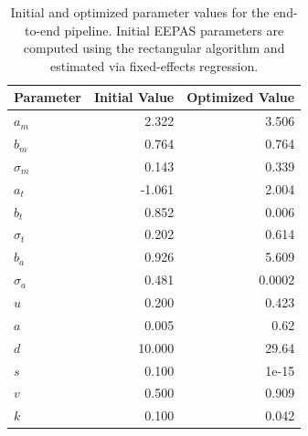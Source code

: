 \documentclass[extra,mreferee]{gji}
\theoremstyle{lemma}
\begin{document}
\begin{table}
\centering
 \caption{Initial and optimized parameter values for the end-to-end pipeline. Initial EEPAS parameters are computed using the rectangular algorithm and estimated via fixed-effects regression.}  \label{tbl:parameters_opt}
\begin{tabular}{lrr}
\toprule
\textbf{Parameter} & \textbf{Initial Value} & \textbf{Optimized Value} \\
\midrule
$a_m$         & 2.322                 & 3.506                    \\
$b_m$         & 0.764                  & 0.764                    \\
$\sigma_m$    & 0.143                  & 0.339                    \\
$a_t$         & -1.061                 & 2.004                    \\
$b_t$         & 0.852                  & 0.006                    \\
$\sigma_t$    & 0.202                  & 0.614                    \\
$b_a$         & 0.926                  & 5.609                    \\
$\sigma_a$    & 0.481                  & 0.0002                    \\
$u$           & 0.200                  & 0.423                    \\
$a$           & 0.005                  & 0.62               \\
$d$           & 10.000                 & 29.64                   \\
$s$           & 0.100                  & 1e-15                    \\
$v$           & 0.500                  & 0.909                    \\
$k$           & 0.100                  & 0.042	                    \\
\bottomrule
\end{tabular}
\end{table}
\end{document}
